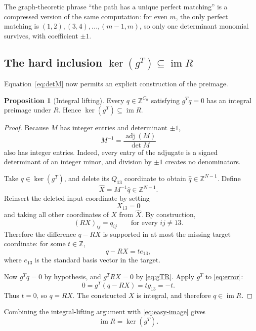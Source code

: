 \documentclass[11pt]{article}
\theoremstyle{definition}
\newtheorem*{innerproposition}{Proposition}
\newcommand{\Z}{\mathbb Z}
\newcommand{\im}{\operatorname{im}}
\begin{document}
The graph-theoretic phrase ``the path has a unique perfect matching'' is a
compressed version of the same computation: for even $m$, the only perfect
matching is $(1,2),(3,4),\ldots,(m-1,m)$, so only one determinant monomial
survives, with coefficient $\pm1$.

\subsection{The hard inclusion \texorpdfstring{$\ker(g^T)\subseteq\im R$}{ker(gT) contained in im(R)}}

Equation~\eqref{eq:detM} now permits an explicit construction of the preimage.

\begin{innerproposition}[Integral lifting]
Every $q\in\Z^{C_n}$ satisfying $g^Tq=0$ has an integral preimage under
$R$.  Hence $\ker(g^T)\subseteq\im R$.
\end{innerproposition}

\begin{proof}
Because $M$ has integer entries and determinant $\pm1$,
\[
 M^{-1}=\frac{\operatorname{adj}(M)}{\det M}
\]
also has integer entries.  Indeed, every entry of the adjugate is a signed
determinant of an integer minor, and division by $\pm1$ creates no
denominators.

Take $q\in\ker(g^T)$, and delete its $Q_{13}$ coordinate to obtain
$\widehat q\in\Z^{N-1}$.  Define
\[
 \widehat X=M^{-1}\widehat q\in\Z^{N-1}.
\]
Reinsert the deleted input coordinate by setting
\[
 X_{13}=0
\]
and taking all other coordinates of $X$ from $\widehat X$.  By construction,
\[
 (RX)_{ij}=q_{ij}
 \qquad\text{for every }ij\neq13.
\]
Therefore the difference $q-RX$ is supported in at most the missing target
coordinate: for some $t\in\Z$,
\begin{equation}\label{eq:error}
 q-RX=t e_{13},
\end{equation}
where $e_{13}$ is the standard basis vector in the target.

Now $g^Tq=0$ by hypothesis, and $g^TRX=0$ by \eqref{eq:gTR}.  Apply $g^T$ to
\eqref{eq:error}:
\[
 0=g^T(q-RX)=t g_{13}=-t.
\]
Thus $t=0$, so $q=RX$.  The constructed $X$ is integral, and therefore
$q\in\im R$.
\end{proof}

Combining the integral-lifting argument with
\eqref{eq:easy-image} gives
\begin{equation}\label{eq:middle-exact}
 \boxed{\im R=\ker(g^T).}
\end{equation}
\end{document}

